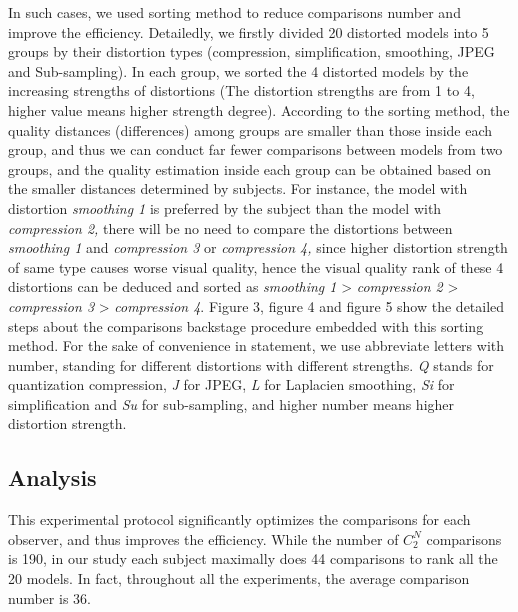 In such cases, we used sorting method \cite{Farrell_2001} to reduce comparisons number and improve the efficiency. Detailedly, we firstly divided 20 distorted models into 5 groups by their distortion types (compression, simplification, smoothing, JPEG and Sub-sampling). In each group, we sorted the 4 distorted models by the increasing strengths of distortions (The distortion strengths are from 1 to 4, higher value means higher strength degree). According to the sorting method, the quality distances (differences) among groups are smaller than those inside each group, and thus we can conduct far fewer comparisons between models from two groups, and the quality estimation inside each group can be obtained based on the smaller distances determined by subjects. For instance, the model with distortion\textit{ smoothing 1} is preferred by the subject than the model with \textit{compression 2,} there will be no need to compare the distortions between \textit{smoothing 1} and \textit{compression 3} or \textit{compression 4,} since higher distortion strength of same type causes worse visual quality, hence the visual quality rank of these 4 distortions can be deduced and sorted as \textit{smoothing 1} > \textit{compression 2} > \textit{compression 3} > \textit{compression 4}. Figure 3, figure 4 and figure 5 show the detailed steps about the comparisons backstage procedure embedded with this sorting method. For the sake of convenience in statement, we use abbreviate letters with number, standing for different distortions with different strengths. \textit{Q} stands for quantization compression, \textit{J} for JPEG, \textit{L} for Laplacien smoothing, \textit{Si} for simplification and \textit{Su} for sub-sampling, and higher number means higher distortion strength.\\
\subsection{Analysis}
This experimental protocol significantly optimizes the comparisons for each observer, and thus improves the efficiency.  While the number of $C^N_2$ comparisons is 190, in our study each subject maximally does 44 comparisons to rank all the 20 models. In fact, throughout all the experiments, the average comparison number is 36.\\

